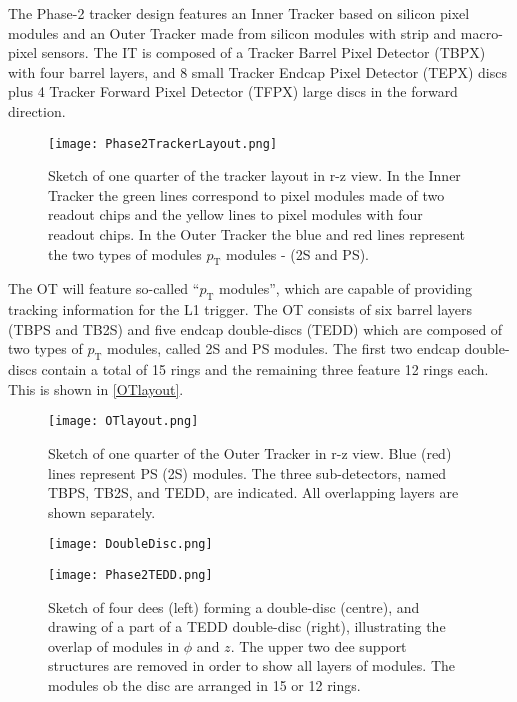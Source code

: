 The Phase-2 tracker design features an Inner Tracker based on silicon pixel modules and an Outer Tracker made from silicon modules with strip and macro-pixel sensors. The IT is composed of a Tracker Barrel Pixel Detector (TBPX) with four barrel layers, and 8 small Tracker Endcap Pixel Detector (TEPX) discs plus 4 Tracker Forward Pixel Detector (TFPX) large discs in the forward direction.

\begin{figure}[H]
\begin{center}
\texttt{[image: Phase2TrackerLayout.png]} 
\caption{ Sketch of one quarter of the tracker layout in r-z view. In the Inner Tracker the green lines correspond to pixel modules made of two readout chips and the yellow lines to pixel modules with four readout chips. In the Outer Tracker the blue and red lines represent the two types of modules  $p_\text{T}$ modules - (2S and PS).}
\label{Phase2TrackerLayout} 
\end{center}
\end{figure}

The OT will feature so-called ``$p_\text{T}$ modules'', which are capable of providing tracking information for the L1 trigger. The OT consists of six barrel layers (TBPS and TB2S) and five endcap double-discs (TEDD) which are composed of two types of $p_\text{T}$ modules, called 2S and PS modules. The first two endcap double-discs contain a total of 15 rings and the remaining three feature 12 rings each. This is shown in \autoref{OTlayout}.

\begin{figure}[H]
\begin{center}
\texttt{[image: OTlayout.png]} 
\caption{Sketch of one quarter of the Outer Tracker in r-z view. Blue (red) lines represent PS (2S) modules. The three sub-detectors, named TBPS, TB2S, and TEDD, are indicated. All overlapping layers are shown separately.}
\label{OTlayout} 
\end{center}
\end{figure}

\begin{figure}[tb]
\begin{center}
\begin{minipage}[b]{0.45\textwidth}
\texttt{[image: DoubleDisc.png]} 
\end{minipage}
\hspace{1em}
\begin{minipage}[b]{0.45\textwidth}
\texttt{[image: Phase2TEDD.png]} 
\end{minipage}
\caption{Sketch of four dees (left) forming a double-disc (centre), and drawing of a part of a TEDD double-disc (right), illustrating the overlap of modules in $\phi$ and $z$. The upper two dee support structures are removed in order to show all layers of modules. The modules ob the disc are arranged in 15 or 12 rings.}
\label{Dees} 
\end{center}
\end{figure}

